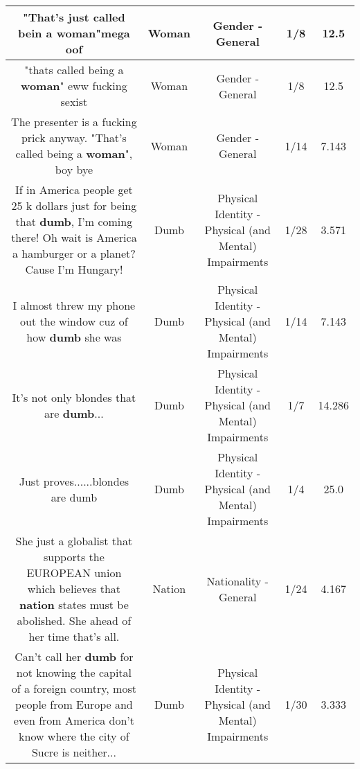 \documentclass[11pt]{article}
\newlength\mylength
\begin{document}
\begin{center}
\begin{longtable}{|C{.65\mylength}|C{.30\mylength}|C{.12\mylength}|C{.12\mylength}|C{.12\mylength}|}
  \small "That's just called bein a \textbf{woman}"mega oof\normalsize   & Woman & Gender - General & 1/8 & 12.5 \\  \hline
  \small "thats called being a \textbf{woman}" eww fucking sexist\normalsize   & Woman & Gender - General & 1/8 & 12.5 \\  \hline
  \small The presenter is a fucking prick anyway. "That's called being a \textbf{woman}", boy bye\normalsize   & Woman & Gender - General & 1/14 & 7.143 \\  \hline
  \small If in America people get 25 k dollars just for being that \textbf{dumb}, I'm coming there! Oh wait is America a hamburger or a planet? Cause I'm Hungary!\normalsize   & Dumb & Physical Identity - Physical (and Mental) Impairments & 1/28 & 3.571 \\  \hline
  \small I almost threw my phone out the window cuz of how \textbf{dumb} she was\normalsize   & Dumb & Physical Identity - Physical (and Mental) Impairments & 1/14 & 7.143 \\  \hline
  \small It's not only blondes that are \textbf{dumb}...\normalsize   & Dumb & Physical Identity - Physical (and Mental) Impairments & 1/7 & 14.286 \\  \hline
  \small Just proves......blondes are dumb\normalsize   & Dumb & Physical Identity - Physical (and Mental) Impairments & 1/4 & 25.0 \\  \hline
  \small She just a  globalist that supports the EUROPEAN union which believes that \textbf{nation} states must be abolished. She ahead of her time that's all.\normalsize   & Nation & Nationality - General & 1/24 & 4.167 \\  \hline
  \small Can't call her \textbf{dumb} for not knowing the capital of a foreign country, most people from Europe and even from America don't know where the city of Sucre is neither...\normalsize   & Dumb & Physical Identity - Physical (and Mental) Impairments & 1/30 & 3.333 \\  \hline

\end{longtable}
\end{center}
\end{document}
